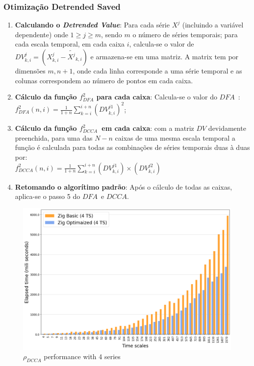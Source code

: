 \documentclass[11pt, aspectratio=169]{beamer}
\newcommand{\pdcca}{\({\rho}_{DCCA}\) }
\newcommand{\dfa}{$DFA$}
\newcommand{\dcca}{$DCCA$}
\begin{document}
\begin{frame}[allowframebreaks]
  \frametitle{Otimização Detrended Saved}
    \bgroup
  \begin{enumerate}
      \item \textbf{Calculando o \emph{Detrended Value}}: Para cada série $X^{j}$ (incluindo a variável dependente) onde  $1 \ge j \ge m$, sendo $m$ o número de séries temporais; para cada escala temporal, em cada caixa $i$, calcula-se o valor de $DV^{j}_{k,i} = (X^{j}_{k,i}-\widetilde{X^{j}}_{k, i})$ e armazena-se em uma matriz. A matrix tem por dimensões $m, n+1$, onde cada linha corresponde a uma série temporal e as colunas correspondem ao número de pontos em cada caixa.
      \item \textbf{Cálculo da função $f_{DFA}^{2}$ para cada caixa}: Calcula-se o valor do \dfa~:\\[10pt]
          $f_{DFA}^{2}(n, i) = \frac{1}{1+n} \sum_{k=i}^{i + n}(DV^{j1}_{k,i})^{2}$;
      \item \textbf{Cálculo da função $f_{DCCA}^{2}$~em cada caixa}: com a matriz $DV$ devidamente preenchida, para uma das $N - n$ caixas de uma mesma escala temporal a função é calculada para todas as combinações de séries temporais duas à duas por:\\[10pt]
          $f_{DCCA}^{2}(n, i) = \frac{1}{1+n} \sum_{k=i}^{i + n}(DV^{j1}_{k,i}) \times (DV^{j2}_{k,i})$
      \item \textbf{Retomando o algorítimo padrão}: Após o cálculo de todas as caixas, aplica-se o passo 5 do \dfa~e \dcca.
    \end{enumerate}
\egroup
\end{frame}

\begin{frame}
  \begin{figure}[!h]
    \includegraphics[width=.8\paperwidth]{../Figures/pylib/elapsed_tws_04.png}
    \caption{\pdcca performance with 4 series}
    \label{performance_04}
  \end{figure}
\end{frame}
\end{document}
